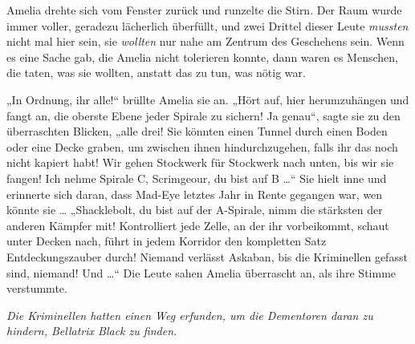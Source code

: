 Amelia drehte sich vom Fenster zurück und runzelte die Stirn. Der Raum wurde immer voller, geradezu lächerlich überfüllt, und zwei Drittel dieser Leute \emph{mussten} nicht mal hier sein, sie \emph{wollten} nur nahe am Zentrum des Geschehens sein. Wenn es eine Sache gab, die Amelia nicht tolerieren konnte, dann waren es Menschen, die taten, was sie wollten, anstatt das zu tun, was nötig war.

„In Ordnung, ihr alle!“ brüllte Amelia sie an.
„Hört auf, hier herumzuhängen und fangt an, die oberste Ebene jeder Spirale zu sichern! Ja genau“, sagte sie zu den überraschten Blicken, „alle drei! Sie könnten einen Tunnel durch einen Boden oder eine Decke graben, um zwischen ihnen hindurchzugehen, falls ihr das noch nicht kapiert habt! Wir gehen Stockwerk für Stockwerk nach unten, bis wir sie fangen! Ich nehme Spirale C, Scrimgeour, du bist auf B …“ Sie hielt inne und erinnerte sich daran, dass Mad-Eye letztes Jahr in Rente gegangen war, wen könnte sie …
„Shacklebolt, du bist auf der A-Spirale, nimm die stärksten der anderen Kämpfer mit! Kontrolliert jede Zelle, an der ihr vorbeikommt, schaut unter Decken nach, führt in jedem Korridor den kompletten Satz Entdeckungszauber durch! Niemand verlässt Askaban, bis die Kriminellen gefasst sind, niemand! Und …“ Die Leute sahen Amelia überrascht an, als ihre Stimme verstummte.

\emph{Die Kriminellen hatten einen Weg erfunden, um die Dementoren daran zu hindern, Bellatrix Black zu finden.}

